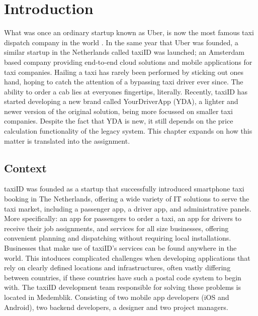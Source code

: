 \graphicspath{{Chapter1/Figs/Vector/}{Chapter1/Figs/}}

%
\chapter{Introduction}
What was once an ordinary startup known as Uber, is now the most famous taxi dispatch company in the world \cite{Uber}. In the same year that Uber was founded, a similar startup in the Netherlands called taxiID was launched; an Amsterdam based company providing end-to-end cloud solutions and mobile applications for taxi companies. Hailing a taxi has rarely been performed by sticking out ones hand, hoping to catch the attention of a bypassing taxi driver ever since. The ability to order a cab lies at everyones fingertips, literally. Recently, taxiID has started developing a new brand called YourDriverApp (YDA), a lighter and newer version of the original solution, being more focussed on smaller taxi companies. Despite the fact that YDA is new, it still depends on the price calculation functionality of the legacy system. This chapter expands on how this matter is translated into the assignment.

%
\section{Context}
taxiID was founded as a startup that successfully introduced smartphone taxi booking in The Netherlands, offering a wide variety of IT solutions to serve the taxi market, including a passenger app, a driver app, and administrative panels. More specifically: an app for passengers to order a taxi, an app for drivers to receive their job assignments, and services for all size businesses, offering convenient planning and dispatching without requiring local installations. Businesses that make use of taxiID's services can be found anywhere in the world. This intoduces complicated challenges when developing applications that rely on clearly defined locations and infrastructures, often vastly differing between countries, if these countries have such a postal code system to begin with. The taxiID development team responsible for solving these problems is located in Medemblik. Consisting of two mobile app developers (iOS and Android), two backend developers, a designer and two project managers.

